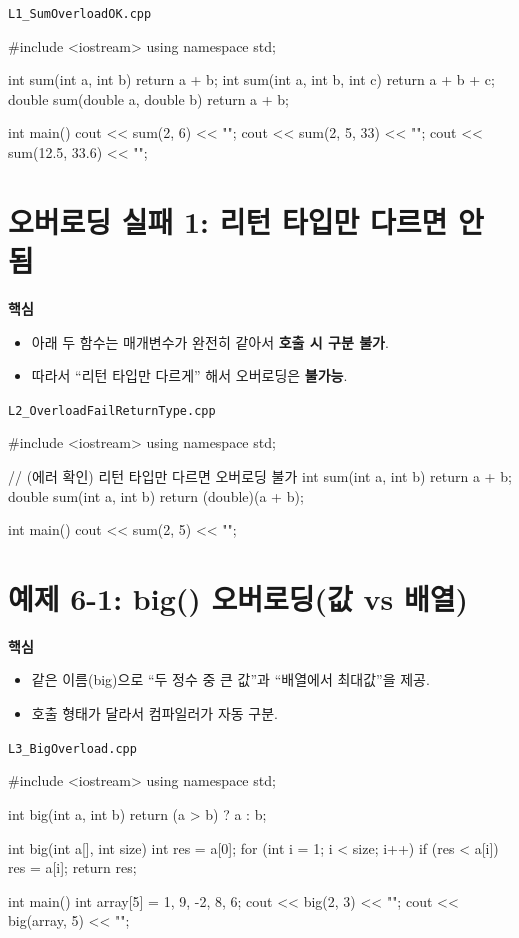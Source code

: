 \documentclass[11pt,a4paper]{article}
\newcommand{\filetag}[1]{\texttt{\color{Accent}#1}}
\begin{document}
\noindent\filetag{L1\_SumOverloadOK.cpp}
\begin{cppcode}
#include <iostream>
using namespace std;

int sum(int a, int b) { return a + b; }
int sum(int a, int b, int c) { return a + b + c; }
double sum(double a, double b) { return a + b; }

int main() {
    cout << sum(2, 6) << "\n";
    cout << sum(2, 5, 33) << "\n";
    cout << sum(12.5, 33.6) << "\n";
}
\end{cppcode}

\section{오버로딩 실패 1: 리턴 타입만 다르면 안 됨}
\begin{GoalBox}
\textbf{핵심}
\begin{itemize}[leftmargin=18pt]
  \item 아래 두 함수는 매개변수가 완전히 같아서 \textbf{호출 시 구분 불가}.
  \item 따라서 ``리턴 타입만 다르게'' 해서 오버로딩은 \textbf{불가능}.
\end{itemize}
\end{GoalBox}

\noindent\filetag{L2\_OverloadFailReturnType.cpp}
\begin{cppcode}
#include <iostream>
using namespace std;

// (에러 확인) 리턴 타입만 다르면 오버로딩 불가
int sum(int a, int b) { return a + b; }
double sum(int a, int b) { return (double)(a + b); }

int main() {
    cout << sum(2, 5) << "\n";
}
\end{cppcode}

\section{예제 6-1: big() 오버로딩(값 vs 배열)}
\begin{GoalBox}
\textbf{핵심}
\begin{itemize}[leftmargin=18pt]
  \item 같은 이름(big)으로 ``두 정수 중 큰 값''과 ``배열에서 최대값''을 제공.
  \item 호출 형태가 달라서 컴파일러가 자동 구분.
\end{itemize}
\end{GoalBox}

\noindent\filetag{L3\_BigOverload.cpp}
\begin{cppcode}
#include <iostream>
using namespace std;

int big(int a, int b) {
    return (a > b) ? a : b;
}

int big(int a[], int size) {
    int res = a[0];
    for (int i = 1; i < size; i++)
        if (res < a[i]) res = a[i];
    return res;
}

int main() {
    int array[5] = {1, 9, -2, 8, 6};
    cout << big(2, 3) << "\n";
    cout << big(array, 5) << "\n";
}
\end{cppcode}
\end{document}
